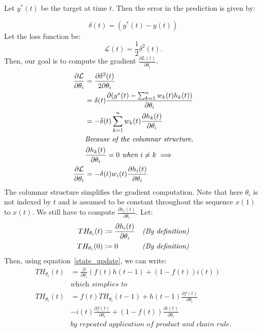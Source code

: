 \documentclass{article}
\begin{document}
Let $y^*(t)$ be the target at time $t$. Then the error in the prediction is given by:

\begin{equation}
    \delta(t) = (y^*(t) - y(t))
\end{equation}
Let the loss function be: 
\begin{equation}
    \mathcal L(t) = \frac{1}{2}\delta^2(t).
\end{equation}
Then, our goal is to compute the gradient $\frac{\partial L(t)}{\partial \theta_i}$. 
\begin{align}
          \frac{\partial \mathcal L}{ \partial \theta_i} &= \frac{\partial \delta^2(t)}{ 2\partial \theta_i } \notag\\
          &= \delta(t)\frac{\partial(y^*(t) - \sum_{k=1}^{n} w_k(t) h_k(t))}{ \partial \theta_i} \notag \\
          &= - \delta(t)\sum_{k=1}^{n} w_k(t) \frac{\partial  h_k(t)}{ \partial \theta_i}\label{before} \\
          & \textit{Because of the columnar structure,} \notag \\ & \frac{\partial  h_k(t)}{ \partial \theta_i}=0 \textit{ when }i \ne k \implies \label{after}\\
          \frac{\partial \mathcal L}{ \partial \theta_i} &= - \delta(t) w_i(t) \frac{\partial  h_i(t)}{ \partial \theta_i} \notag
    \end{align}
The columnar structure simplifies the gradient computation.    
Note that here $\theta_i$ is not indexed by $t$ and is assumed to be constant throughout the sequence $x(1)$ to $x(t)$. We still have to compute $\frac{\partial h_i(t)}{ \partial \theta_i}$.  Let:
\begin{align}
 TH_{\theta_i}(t)  & \vcentcolon = \frac{\partial h_i(t)}{\partial \theta_i}  && \textit{(By definition)} \label{def1} \\
 TH_{\theta_i}(0)  & \vcentcolon = 0  && \textit{(By definition)} \label{def2} 
\end{align}
Then, using equation~\ref{state_update}, we can write:
\begin{align*}
  TH_{\theta_i}(t) & = \frac{\partial}{\partial \theta_i} \left ( f(t)h(t-1) + (1-f(t))i(t) \right ) \\ & \textit{which simplies to} \\
   TH_{\theta_i}(t) & = f(t)TH_{\theta_i}(t-1)  + h(t-1)\frac{\partial f(t)}{\partial \theta_i} \\ & - i(t)\frac{\partial f(t)}{\partial \theta_i}  +   (1-f(t))\frac{\partial i(t)}{\partial \theta_i} \\  & \textit{by repeated application of product and chain rule.} 
\end{align*}
\end{document}
